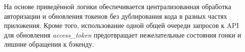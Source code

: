 На основе приведённой логики обеспечивается централизованная обработка авторизации и обновления токенов без дублирования кода в разных частях приложения. Кроме того, использование одной общей очереди запросов к API для обновления \textit{access\_token} предотвращает нежелательные состояния гонки и лишние обращения к бэкенду.
